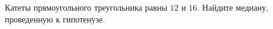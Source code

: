 \begin{ex}
	\begin{condition}
		Катеты прямоугольного треугольника равны \( 12  \) и \( 16 \). Найдите медиану, проведенную к гипотенузе.
	\end{condition}
\end{ex}